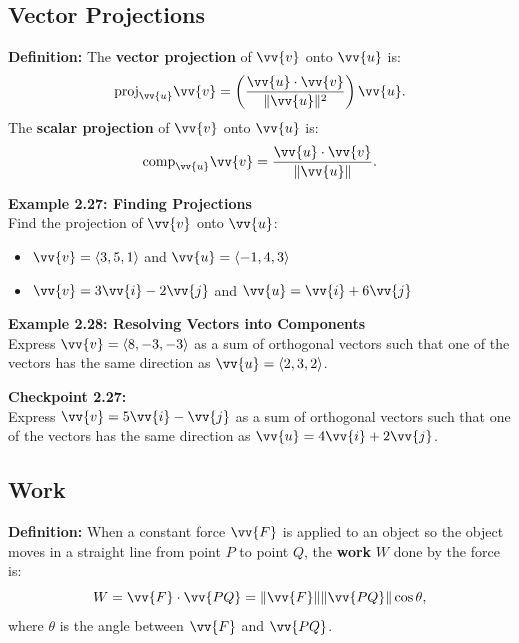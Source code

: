 \documentclass{article}
\begin{document}
\subsection*{Vector Projections}

\begin{definitionbox}
    \textbf{Definition:} The \textbf{vector projection} of \(\vv{v}\) onto \(\vv{u}\) is:
    \[
    \text{proj}_{\vv{u}} \vv{v} = \left( \frac{\vv{u} \cdot \vv{v}}{\|\vv{u}\|^2} \right) \vv{u}.
    \]
    The \textbf{scalar projection} of \(\vv{v}\) onto \(\vv{u}\) is:
    \[
    \text{comp}_{\vv{u}} \vv{v} = \frac{\vv{u} \cdot \vv{v}}{\|\vv{u}\|}.
    \]
\end{definitionbox}

\begin{examplebox}
    \textbf{Example 2.27: Finding Projections} \\
    Find the projection of \(\vv{v}\) onto \(\vv{u}\):
    \begin{itemize}
        \item \(\vv{v} = \langle 3, 5, 1 \rangle\) and \(\vv{u} = \langle -1, 4, 3 \rangle\)
        \item \(\vv{v} = 3\vv{i} - 2\vv{j}\) and \(\vv{u} = \vv{i} + 6\vv{j}\)
    \end{itemize}
\end{examplebox}

\begin{examplebox}
    \textbf{Example 2.28: Resolving Vectors into Components} \\
    Express \(\vv{v} = \langle 8, -3, -3 \rangle\) as a sum of orthogonal vectors such that one of the vectors has the same direction as \(\vv{u} = \langle 2, 3, 2 \rangle\).
\end{examplebox}

\begin{exercisebox}
    \textbf{Checkpoint 2.27:} \\
    Express \(\vv{v} = 5\vv{i} - \vv{j}\) as a sum of orthogonal vectors such that one of the vectors has the same direction as \(\vv{u} = 4\vv{i} + 2\vv{j}\).
\end{exercisebox}

\subsection*{Work}

\begin{definitionbox}
    \textbf{Definition:} When a constant force \(\vv{F}\) is applied to an object so the object moves in a straight line from point \(P\) to point \(Q\), the \textbf{work} \(W\) done by the force is:
    \[
    W = \vv{F} \cdot \vv{PQ} = \|\vv{F}\| \|\vv{PQ}\| \cos \theta,
    \]
    where \(\theta\) is the angle between \(\vv{F}\) and \(\vv{PQ}\).
\end{definitionbox}
\end{document}
